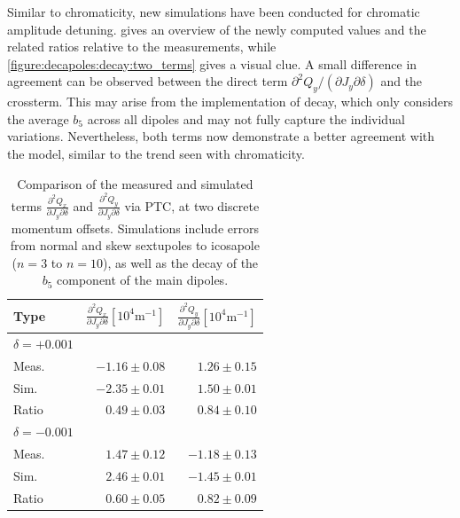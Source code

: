 Similar to chromaticity, new simulations have been conducted for chromatic amplitude detuning.
 gives an overview of the newly computed values and 
the related ratios relative to the measurements, while \cref{figure:decapoles:decay:two_terms} gives
a visual clue.
A small difference in agreement can be observed between the direct term $\partial^2 Q_y / (\partial
J_y \partial \delta)$ and the crossterm. This may arise from the implementation of decay, which only
considers the average $b_5$ across all dipoles and may not fully capture the individual variations.
Nevertheless, both terms now demonstrate a better agreement with the model, similar to the trend seen
with chromaticity.


\begin{table}[H]
  \centering
  \begin{tabular}{lrr}
  \toprule
   Type  & $\frac{\partial^2 Q_x}{\partial J_y \partial \delta}[10^{4}\mathrm{m}^{-1}]$ & $\frac{\partial^2 Q_y}{\partial J_y \partial \delta}[10^{4}\mathrm{m}^{-1}]$ \\
  \midrule
  $\delta = +0.001$ & & \\
  \hspace{2mm}Meas.  &   $-1.16 \pm 0.08$ &  $1.26 \pm 0.15$  \\
  \hspace{2mm}Sim.   &   $-2.35 \pm 0.01$ &  $1.50 \pm 0.01$  \\
  \hspace{2mm}Ratio  &   $ 0.49 \pm 0.03$ &  $0.84 \pm 0.10$  \\
  $\delta = -0.001$ & & \\
  \hspace{2mm}Meas.  &  $1.47 \pm 0.12$  &   $-1.18 \pm 0.13$ \\
  \hspace{2mm}Sim.   &  $2.46 \pm 0.01$  &   $-1.45 \pm 0.01$ \\
  \hspace{2mm}Ratio  &  $0.60 \pm 0.05$  &   $ 0.82 \pm 0.09$ \\
  \bottomrule
  \end{tabular}
  \caption{Comparison of the measured and simulated terms $\frac{\partial^2 Q_x}{\partial J_y
  \partial \delta}$ and $\frac{\partial^2 Q_y}{\partial J_y \partial \delta}$ via PTC, at two
  discrete momentum offsets. Simulations include errors from normal and skew sextupoles to 
  icosapole ($n=3$ to $n=10$), as well as the decay of the $b_5$ component of the main dipoles.}
  \label{table:decapoles:decay:chromatic_ampdet}
\end{table}

